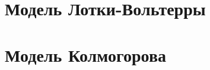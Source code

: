 \documentclass[14pt, a4paper, titlepage, fleqn]{extarticle}
\begin{document}
    
    
    \tableofcontents

    \pagebreak

    
    
    \pagebreak
    
    \section{Модель Лотки-Вольтерры}

    

    \pagebreak

    

    \pagebreak

    

    \pagebreak
    
    \section{Модель Колмогорова}

    

    \pagebreak

    

    \pagebreak

    

    \pagebreak

    

    \pagebreak

    
\end{document}
